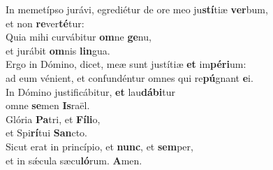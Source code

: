 \oddverse In memetípso jurávi, egrediétur de ore meo ju\textbf{stí}tiæ \textbf{ver}bum,~\*\\
\oddverse et non \textbf{re}ver\textbf{té}tur:\\
\evenverse Quia mihi curvábitur \textbf{om}ne \textbf{ge}nu,~\*\\
\evenverse et jurábit \textbf{om}nis \textbf{lin}gua.\\
\oddverse Ergo in Dómino, dicet, meæ sunt justítiæ \textbf{et} im\textbf{pé}\textbf{ri}um:~\*\\
\oddverse ad eum vénient, et confundéntur omnes qui re\textbf{pú}gnant \textbf{e}i.\\
\evenverse In Dómino justificábitur, \textbf{et} lau\textbf{dá}\textbf{bi}tur~\*\\
\evenverse omne \textbf{se}men \textbf{Is}raël.\\
\oddverse Glória \textbf{Pa}tri, et \textbf{Fí}\textbf{li}o,~\*\\
\oddverse et Spi\textbf{rí}tui \textbf{San}cto.\\
\evenverse Sicut erat in princípio, et \textbf{nunc}, et \textbf{sem}per,~\*\\
\evenverse et in sǽcula sæcu\textbf{ló}rum. \textbf{A}men.\\
